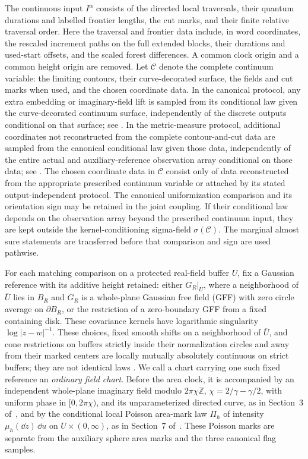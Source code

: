 The continuous input \(I^\alpha\) consists of the directed local
traversals, their quantum durations and labelled frontier lengths, the
cut marks, and their finite relative traversal order.  Here the
traversal and frontier data include, in word coordinates, the rescaled
increment paths on the full extended blocks, their durations and
used-start offsets, and the scaled forest differences.  A common clock
origin and a common height origin are removed.  Let \(\mathcal C\)
denote the complete continuum variable: the limiting contours, their
curve-decorated surface, the fields and cut marks when used, and the
chosen coordinate data.  In the canonical protocol, any extra embedding
or imaginary-field lift is sampled from its conditional law given the
curve-decorated continuum surface, independently of the discrete outputs
conditional on that surface; see \cite[Theorem~5.9]{C}.  In the
metric-measure protocol, additional coordinates not reconstructed from
the complete contour-and-cut data are sampled from the canonical
conditional law given those data, independently of the entire actual and
auxiliary-reference observation array conditional on those data; see
\cite[Theorem~7.10]{P}.
The chosen coordinate data in \(\mathcal C\) consist only of data
reconstructed from the appropriate prescribed continuum variable or
attached by its stated output-independent protocol.  The canonical
uniformization comparison and its orientation sign may be retained in the
joint coupling.  If their conditional law depends on the observation
array beyond the prescribed continuum input, they are kept outside the
kernel-conditioning sigma-field \(\sigma(\mathcal C)\).  The marginal
almost sure statements are transferred before that comparison and sign
are used pathwise.

For each matching comparison on a protected real-field buffer \(U\), fix
a Gaussian reference with its additive height retained: either \(G_R|_U\),
where a neighborhood of \(\overline U\) lies in \(B_R\) and \(G_R\) is a
whole-plane Gaussian free field (GFF) with zero circle average on
\(\partial B_R\), or the restriction of a zero-boundary GFF from a fixed
containing disk.  These covariance kernels have logarithmic singularity
\(\log|z-w|^{-1}\).  These choices, fixed smooth shifts on a neighborhood
of \(\overline U\), and cone restrictions on buffers strictly inside their
normalization circles and away from their marked centers are locally mutually
absolutely continuous on strict
buffers; they are not identical laws
\cite[Proposition~5.12]{C} \cite[Lemmas~3.3 and~9.2]{P}.
We call a chart carrying one such fixed reference an \emph{ordinary field
chart}.  Before the area clock, it is accompanied by an independent
whole-plane imaginary field modulo \(2\pi\chi\mathbb Z\),
\(\chi=2/\gamma-\gamma/2\), with uniform phase in \([0,2\pi\chi)\), and
its unparameterized directed curve, as in Section~3 of~\cite{C}, and by
the conditional local Poisson area-mark law \(\Pi_h\) of intensity
\(\mu_h(\dd z)\,\dd u\) on \(U\times(0,\infty)\), as in Section~7
of~\cite{P}.  These Poisson marks are separate from the auxiliary sphere
area marks and the three canonical flag samples.

